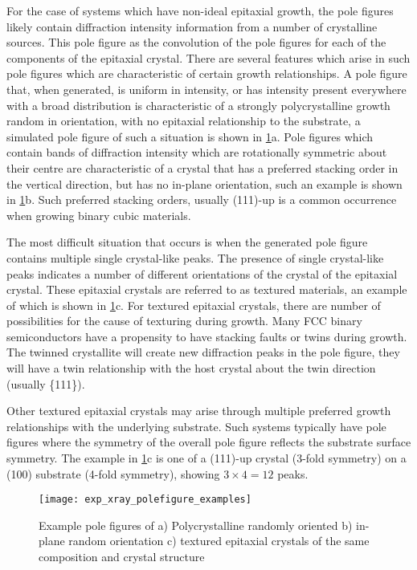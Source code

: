 For the case of systems which have non-ideal epitaxial growth, the pole figures likely contain diffraction intensity information from a number of crystalline sources. This pole figure as the convolution of the pole figures for each of the components of the epitaxial crystal. There are several features which arise in such pole figures which are characteristic of certain growth relationships. A pole figure that, when generated, is uniform in intensity, or has intensity present everywhere with a broad distribution is characteristic of a strongly polycrystalline growth random in orientation, with no epitaxial relationship to the substrate, a simulated pole figure of such a situation is shown in \cref{fig:exp_xray_polefigure_examples}a. Pole figures which contain bands of diffraction intensity which are rotationally symmetric about their centre are characteristic of a crystal that has a preferred stacking order in the vertical direction, but has no in-plane orientation, such an example is shown in \cref{fig:exp_xray_polefigure_examples}b. Such preferred stacking orders, usually (111)-up is a common occurrence when growing binary cubic materials.

The most difficult situation that occurs is when the generated pole figure contains multiple single crystal-like peaks. The presence of single crystal-like peaks indicates a number of different orientations of the crystal of the epitaxial crystal. These epitaxial crystals are referred to as textured materials, an example of which is shown in \cref{fig:exp_xray_polefigure_examples}c. For textured epitaxial crystals, there are number of possibilities for the cause of texturing during growth. Many FCC binary semiconductors have a propensity to have stacking faults or twins during growth. The twinned crystallite will create new diffraction peaks in the pole figure, they will have a twin relationship with the host crystal about the twin direction (usually \{111\}).

Other textured epitaxial crystals may arise through multiple preferred growth relationships with the underlying substrate. Such systems typically have pole figures where the symmetry of the overall pole figure reflects the substrate surface symmetry. The example in \cref{fig:exp_xray_polefigure_examples}c is one of a (111)-up crystal (3-fold symmetry) on a (100) substrate (4-fold symmetry), showing $3\times 4=12$ peaks.
\begin{figure}
    \centering
    \texttt{[image: exp\_xray\_polefigure\_examples]}
    \caption[Example simulated pole figures]{\label{fig:exp_xray_polefigure_examples}Example pole figures of a) Polycrystalline randomly oriented b) in-plane random orientation c) textured epitaxial crystals of the same composition and crystal structure}
\end{figure}

